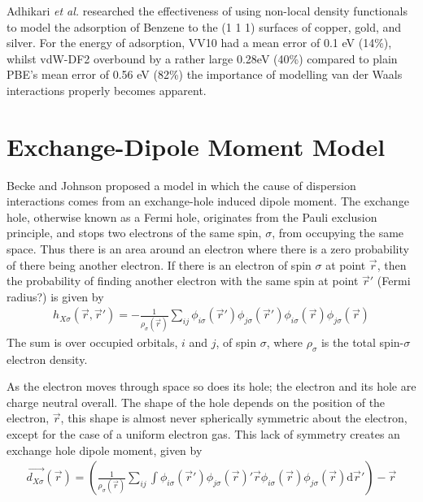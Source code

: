 \documentclass[10pt,a4paper,twocolumn,twoside]{extarticle}
\newcommand{\al}{\emph{et al. }}
\renewcommand{\d}{\text{d}}
\begin{document}
	Adhikari \al researched the effectiveness of using non-local density functionals to model the adsorption of Benzene to the (1 1 1) surfaces of copper, gold, and silver.\cite{VV10-Adsorption}  For the energy of adsorption, VV10 had a mean error of 0.1 eV (14\%), whilst vdW-DF2 overbound by a rather large 0.28eV (40\%) compared to plain PBE's mean error of 0.56 eV (82\%) the importance of modelling van der Waals interactions properly becomes apparent. 

	



	


	\section{Exchange-Dipole Moment Model}
	Becke and Johnson proposed a model in which the cause of dispersion interactions comes from an exchange-hole induced dipole moment.\cite{XDM-dipole,XDM-HF,XDM-HigherOrder} The exchange hole, otherwise known as a Fermi hole, originates from the Pauli exclusion principle, and stops two electrons of the same spin, $\sigma$, from occupying the same space. Thus there is an area around an electron where there is a zero probability of there being another electron. If there is an electron of spin $\sigma$ at point $\vec{r}$, then the probability of finding another electron with the same spin at point $\vec{r}'$ \color{red}(Fermi radius?)\color{black} is given by 
	\begin{align}
		h_{X\sigma}(\vec{r},\vec{r}') = -\frac{1}{\rho_\sigma(\vec{r})} \sum_{ij} 
										\phi_{i\sigma}(\vec{r}') \phi_{j\sigma}(\vec{r}')
										\phi_{i\sigma}(\vec{r}) \phi_{j\sigma}(\vec{r}) 
	\end{align}
	The sum is over occupied orbitals, $i$ and $j$, of spin $\sigma$, where $\rho_\sigma$ is the total spin-$\sigma$ electron density. 

	As the electron moves through space so does its hole; the electron and its hole are charge neutral overall. 
	The shape of the hole depends on the position of the electron, $\vec{r}$, this shape is almost never spherically symmetric about the electron, except for the case of a uniform electron gas. This lack of symmetry creates an exchange hole dipole moment, given by 
	\footnotesize
	\begin{align}
		\label{eq:exchange-dipole}
		\vec{d_{X\sigma}}(\vec{r}) = \left( \frac{1}{\rho_\sigma(\vec{r})} \sum_{ij}\int
									 \phi_{i\sigma}(\vec{r}') \phi_{j\sigma}(\vec{r})' 
									 \vec{r}\phi_{i\sigma}(\vec{r}) \phi_{j\sigma}(\vec{r}) 
									 \d\vec{r}'\right) - \vec{r}
	\end{align}
	\normalsize
\end{document}
